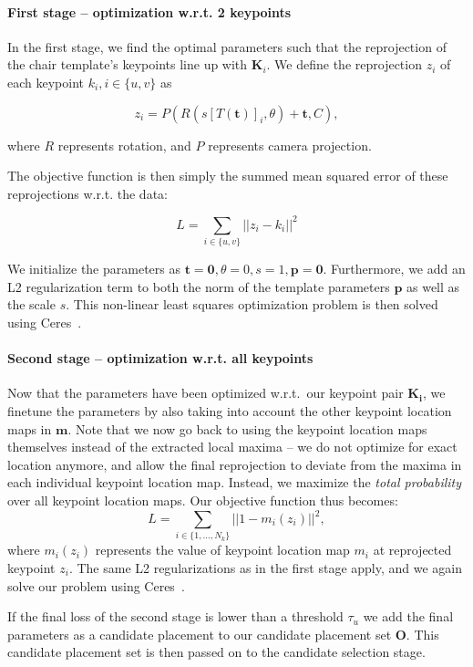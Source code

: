 \documentclass[10pt,twocolumn,letterpaper]{article}
\newcommand{\bb}[1]{{\bm{#1}}}
\begin{document}
\paragraph{First stage -- optimization w.r.t. 2 keypoints}
In the first stage, we find the optimal parameters such that the reprojection of the chair template's keypoints line up with $\bb{K}_i$.
We define the reprojection $z_i$ of each keypoint $k_i, i \in \{u, v\}$ as

\[ z_i = P(R(s[T(\bb{t})]_i, \theta) + \bb{t}, C), \]

where $R$ represents rotation, and $P$ represents camera projection.

The objective function is then simply the summed mean squared error of these reprojections w.r.t. the data:

\[ L = \sum_{i \in \{u, v\}} ||z_i - k_i||^2 \]

We initialize the parameters as $\bb{t} = \bb{0}, \theta = 0, s = 1,
\bb{p} = \bb{0}$. Furthermore, we add an L2 regularization term to both
the norm of the template parameters $\bb{p}$ as well as the scale $s$.
This non-linear least squares optimization problem is then solved using Ceres~\cite{Ceres}.

\paragraph{Second stage -- optimization w.r.t. all keypoints}
Now that the parameters have been optimized w.r.t.\ our keypoint pair $\bb{K_i}$, we 
finetune the parameters by also taking into account the other keypoint location maps in $\bb{m}$.
Note that we now go back to using the keypoint location maps themselves instead
of the extracted local maxima -- we do not optimize for exact location anymore, and
allow the final reprojection to deviate from the maxima in each individual keypoint location map.
Instead, we maximize the \emph{total probability} over all keypoint location maps. Our objective function thus becomes:
\[ L = \sum_{i \in \{1, \ldots, N_k\}} ||1 - m_i(z_i)||^2, \]
where $m_i(z_i)$ represents the value of keypoint location map $m_i$ at reprojected keypoint $z_i$.
The same L2 regularizations as in the first stage apply, and we again solve our problem using Ceres~\cite{Ceres}.

If the final loss of the second stage is lower than a threshold $\tau_u$ we add the final parameters
as a candidate placement to our candidate placement set $\bb{O}$. This candidate placement set
is then passed on to the candidate selection stage.
\end{document}
